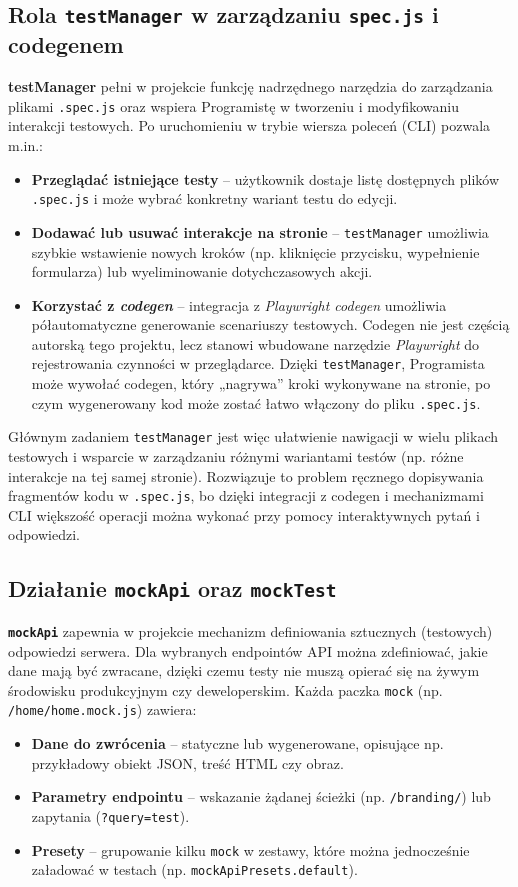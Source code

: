 \documentclass[12pt]{report}
\begin{document}
\subsection{Rola \texttt{testManager} w zarządzaniu \texttt{spec.js} i codegenem}
\label{sec:rola-testManager}
\textbf{testManager} pełni w projekcie funkcję nadrzędnego narzędzia do zarządzania plikami \texttt{.spec.js} oraz wspiera Programistę w tworzeniu i modyfikowaniu interakcji testowych. Po uruchomieniu w trybie wiersza poleceń (CLI) pozwala m.in.:
\begin{itemize}
    \item \textbf{Przeglądać istniejące testy} -- użytkownik dostaje listę dostępnych plików \texttt{.spec.js} i może wybrać konkretny wariant testu do edycji.
    \item \textbf{Dodawać lub usuwać interakcje na stronie} -- \texttt{testManager} umożliwia szybkie wstawienie nowych kroków (np. kliknięcie przycisku, wypełnienie formularza) lub wyeliminowanie dotychczasowych akcji.
    \item \textbf{Korzystać z \textit{codegen}} -- integracja z \textit{Playwright codegen} umożliwia półautomatyczne generowanie scenariuszy testowych. Codegen nie jest częścią autorską tego projektu, lecz stanowi wbudowane narzędzie \textit{Playwright} do rejestrowania czynności w przeglądarce. Dzięki \texttt{testManager}, Programista może wywołać codegen, który „nagrywa” kroki wykonywane na stronie, po czym wygenerowany kod może zostać łatwo włączony do pliku \texttt{.spec.js}.
\end{itemize}

\noindent Głównym zadaniem \texttt{testManager} jest więc ułatwienie nawigacji w wielu plikach testowych i wsparcie w zarządzaniu różnymi wariantami testów (np. różne interakcje na tej samej stronie). Rozwiązuje to problem ręcznego dopisywania fragmentów kodu w \texttt{.spec.js}, bo dzięki integracji z codegen i mechanizmami CLI większość operacji można wykonać przy pomocy interaktywnych pytań i odpowiedzi.

\subsection{Działanie \texttt{mockApi} oraz \texttt{mockTest}}
\label{sec:dzialanie-mocki}
\textbf{\texttt{mockApi}} zapewnia w projekcie mechanizm definiowania sztucznych (testowych) odpowiedzi serwera. Dla wybranych endpointów API można zdefiniować, jakie dane mają być zwracane, dzięki czemu testy nie muszą opierać się na żywym środowisku produkcyjnym czy deweloperskim. Każda paczka \texttt{mock} (np. \texttt{/home/home.mock.js}) zawiera:
\begin{itemize}
    \item \textbf{Dane do zwrócenia} -- statyczne lub wygenerowane, opisujące np. przykładowy obiekt JSON, treść HTML czy obraz.
    \item \textbf{Parametry endpointu} -- wskazanie żądanej ścieżki (np. \texttt{/branding/}) lub zapytania (\texttt{?query=test}).
    \item \textbf{Presety} -- grupowanie kilku \texttt{mock} w zestawy, które można jednocześnie załadować w testach (np. \texttt{mockApiPresets.default}).
\end{itemize}
\end{document}
